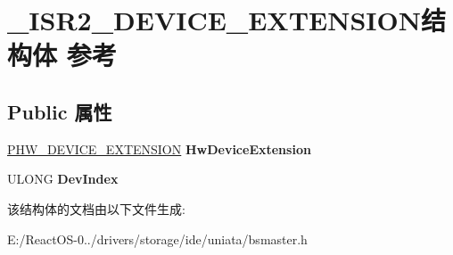 \hypertarget{struct___i_s_r2___d_e_v_i_c_e___e_x_t_e_n_s_i_o_n}{}\section{\+\_\+\+I\+S\+R2\+\_\+\+D\+E\+V\+I\+C\+E\+\_\+\+E\+X\+T\+E\+N\+S\+I\+O\+N结构体 参考}
\label{struct___i_s_r2___d_e_v_i_c_e___e_x_t_e_n_s_i_o_n}
\subsection*{Public 属性}
\begin{DoxyCompactItemize}
\item 
\mbox{\label{struct___i_s_r2___d_e_v_i_c_e___e_x_t_e_n_s_i_o_n_ab4b0a91f67c2992aaca188975f0c586f}} 
\hyperlink{struct___h_w___d_e_v_i_c_e___e_x_t_e_n_s_i_o_n}{P\+H\+W\+\_\+\+D\+E\+V\+I\+C\+E\+\_\+\+E\+X\+T\+E\+N\+S\+I\+ON} {\bfseries Hw\+Device\+Extension}
\item 
\mbox{\label{struct___i_s_r2___d_e_v_i_c_e___e_x_t_e_n_s_i_o_n_a678a58dfb5a551ca7615a00e0827cdbb}} 
U\+L\+O\+NG {\bfseries Dev\+Index}
\end{DoxyCompactItemize}


该结构体的文档由以下文件生成\+:\begin{DoxyCompactItemize}
\item 
E\+:/\+React\+O\+S-\/0../drivers/storage/ide/uniata/bsmaster.\+h\end{DoxyCompactItemize}
